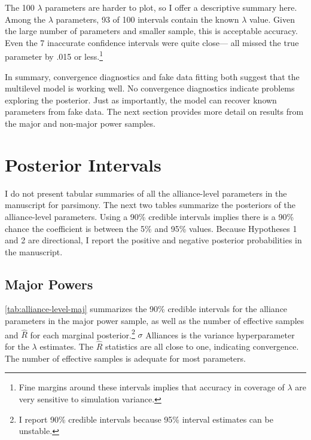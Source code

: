 \documentclass[12pt]{article}
\begin{document}
 
The 100 $\lambda$ parameters are harder to plot, so I offer a descriptive summary here. 
Among the $\lambda$ parameters, 93 of 100 intervals contain the known $\lambda$ value.
Given the large number of parameters and smaller sample, this is acceptable accuracy. 
Even the 7 inaccurate confidence intervals were quite close--- all missed the true parameter by .015 or less.\footnote{Fine margins around these intervals implies that accuracy in coverage of $\lambda$ are very sensitive to simulation variance.}


In summary, convergence diagnostics and fake data fitting both suggest that the multilevel model is working well. 
No convergence diagnostics indicate problems exploring the posterior. 
Just as importantly, the model can recover known parameters from fake data. 
The next section provides more detail on results from the major and non-major power samples. 



\section{Posterior Intervals} 


I do not present tabular summaries of all the alliance-level parameters in the manuscript for parsimony. 
The next two tables summarize the posteriors of the alliance-level parameters. 
Using a 90\% credible intervals implies there is a 90\% chance the coefficient is between the 5\% and 95\% values. 
Because Hypotheses 1 and 2 are directional, I report the positive and negative posterior probabilities in the manuscript.  

\subsection{Major Powers}


\autoref{tab:alliance-level-maj} summarizes the 90\% credible intervals for the alliance parameters in the major power sample, as well as the number of effective samples and $\hat{R}$ for each marginal posterior.\footnote{I report 90\% credible intervals because 95\% interval estimates can be unstable.} 
$\sigma$ Alliances is the variance hyperparameter for the $\lambda$ estimates. 
The $\hat{R}$ statistics are all close to one, indicating convergence. 
The number of effective samples is adequate for most parameters. 
\end{document}
